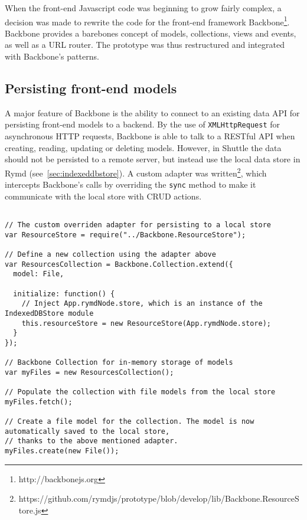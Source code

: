 When the front-end Javascript code was beginning to grow fairly complex, a decision was made to rewrite the code for the front-end framework Backbone\footnote{http://backbonejs.org}. Backbone provides a barebones concept of models, collections, views and events, as well as a URL router. The prototype was thus restructured and integrated with Backbone's patterns.

\subsection{Persisting front-end models}

A major feature of Backbone is the ability to connect to an existing data API for persisting front-end models to a backend. By the use of \texttt{XMLHttpRequest} for asynchronous HTTP requests, Backbone is able to talk to a RESTful API when creating, reading, updating or deleting models. However, in Shuttle the data should not be persisted to a remote server, but instead use the local data store in Rymd (see~\ref{sec:indexeddbstore}). A custom adapter was written\footnote{https://github.com/rymdjs/prototype/blob/develop/lib/Backbone.ResourceStore.js}, which intercepts Backbone's calls by overriding the \texttt{sync} method to make it communicate with the local store with CRUD actions.

\begin{Code}
\begin{lstlisting}[caption={Sample scenario of persisting models}, label={lst:backbonesync}]

// The custom overriden adapter for persisting to a local store
var ResourceStore = require("../Backbone.ResourceStore");

// Define a new collection using the adapter above
var ResourcesCollection = Backbone.Collection.extend({
  model: File,

  initialize: function() {
    // Inject App.rymdNode.store, which is an instance of the IndexedDBStore module
    this.resourceStore = new ResourceStore(App.rymdNode.store);
  }
});

// Backbone Collection for in-memory storage of models
var myFiles = new ResourcesCollection();

// Populate the collection with file models from the local store
myFiles.fetch();

// Create a file model for the collection. The model is now automatically saved to the local store,
// thanks to the above mentioned adapter.
myFiles.create(new File());
\end{lstlisting}
\end{Code}

